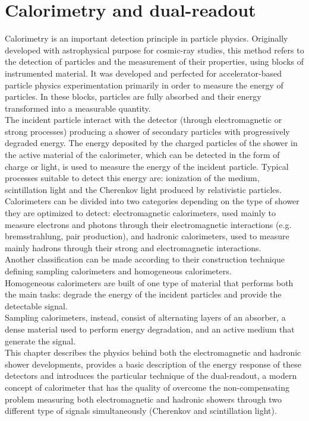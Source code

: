 \chapter{Calorimetry and dual-readout}
Calorimetry is an important detection principle in particle physics.
Originally developed with astrophysical purpose for cosmic-ray studies, this method refers to the detection of particles and the measurement of their properties, using blocks of instrumented material.
It was developed and perfected for accelerator-based particle physics experimentation primarily in order to measure the energy of particles. 
In these blocks, particles are fully absorbed and their energy transformed into a measurable quantity.\\
The incident particle interact with the detector (through electromagnetic or strong processes) producing a shower of secondary particles with progressively degraded energy.
The energy deposited by the charged particles of the shower in the active material of the calorimeter, which can be detected in the form of charge or light, is used to measure the energy of the incident particle.
Typical processes suitable to detect this energy are: ionization of the medium, scintillation light and the Cherenkov light produced by relativistic particles.\\

Calorimeters can be divided into two categories depending on the type of shower they are optimized to detect: electromagnetic calorimeters, used mainly to measure electrons and photons through their electromagnetic interactions (e.g.
bremsstrahlung, pair production), and hadronic calorimeters, used to measure mainly hadrons through their strong and electromagnetic interactions.\\
Another classification can be made according to their construction technique defining sampling calorimeters and homogeneous calorimeters.\\
Homogeneous calorimeters are built of one type of material that performs both the main tasks: degrade the energy of the incident particles and provide the detectable signal.\\
Sampling calorimeters, instead, consist of alternating layers of an absorber, a dense material used to perform energy degradation, and an active medium that generate the signal.\\

This chapter describes the physics behind both the electromagnetic and hadronic shower developments, provides a basic description of the energy response of these detectors and introduces the particular technique of the dual-readout, a modern concept of calorimeter that has the quality of overcome the non-compensating problem measuring both electromagnetic and hadronic showers through two different type of signals simultaneously (Cherenkov and scintillation light).\\


